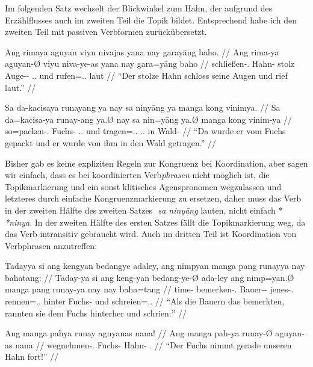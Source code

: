 \documentclass[12pt,paper=a4]{scrartcl}
\newcommand{\PargI}{{\Parg}.{\Inan}}
\newcommand{\TsgM}{{\Tsg}.{\M}}
\newcommand{\TplM}{{\Tpl}.{\M}}
\newcommand{\zwsp}{\mbox{​}} %
\newcommand{\rayr}[2]{\zwsp\smash{{\Tagati #1}} \emph{#2}} %
\begin{document}
Im folgenden Satz wechselt der Blickwinkel zum Hahn, der aufgrund des Erzählflusses auch im zweiten Teil die Topik bildet. Entsprechend habe ich den zweiten Teil mit passiven Verbformen zurückübersetzt. 

\pex %
\a\begingl
	\gla Ang rimaya aguyan viyu nivajas yana nay garayāng baho. //
	\glb Ang rima-ya aguyan-Ø viyu niva-ye-as yana nay gara=yāng baho //
	\glc \AgtT{} schließen-\TsgM{} Hahn-\Top{} stolz Auge-\Pl{}-\Parg{} \TsgM{}.\Gen{} und rufen=\TsgM{}.\Aarg{} laut //
	\glft \enquote{Der stolze Hahn schloss seine Augen und rief laut.} //
\endgl

\a\begingl
	\gla Sa da-kacisaya runayang ya nay sa ninyāng ya manga kong vinimya. //
	\glb Sa da=kacisa-ya runay-ang ya.Ø nay sa nin=yāng ya.Ø manga kong vinim-ya //
	\glc \PatT{} so=packen-\TsgM{} Fuchs-\Aarg{} \TsgM{}.\Top{} und \PatT{} tragen=\TsgM{}.\Aarg{} \TsgM{}.\Top{} \Dyn{} in Wald-\Loc{} //
	\glft \enquote{Da wurde er vom Fuchs gepackt und er wurde von ihm in den Wald getragen.} //
\endgl

\xe

Bisher gab es keine expliziten Regeln zur Kongruenz bei Koordination, aber sagen wir einfach, dass es bei koordinierten Verb\emph{phrasen} nicht möglich ist, die Topikmarkierung und ein sonst klitisches Agenspronomen wegzulassen und letzteres durch einfache Kongruenzmarkierung zu ersetzen, daher muss das Verb in der zweiten Hälfte des zweiten Satzes \rayr{s ninFyaaNF}{sa ninyāng} lauten, nicht einfach *\rayr{ninY}{*ninya}. In der zweiten Hälfte des ersten Satzes fällt die Topikmarkierung weg, da das Verb intransitiv gebraucht wird. Auch im dritten Teil ist Koordination von Verbphrasen anzutreffen:

\pex %
\a\begingl
	\gla Tadayya si ang kengyan bedangye adaley, ang nimpyan manga pang runayya nay bahatang: //
	\glb Taday-ya si ang keng-yan bedang-ye-Ø ada-ley ang nimp=yan.Ø manga pang runay-ya nay nay baha=tang //
	\glc time-\Loc{} \Rel{} \AgtT{} bemerken-\TplM{} Bauer-\Pl{}-\Top{} jenes-\PargI{} \AgtT{} rennen=\TplM{}.\Top{} \Dyn{} hinter Fuchs-\Loc{} und schreien=\TplM{}.\Aarg{} //
	\glft \enquote{Als die Bauern das bemerkten, rannten sie dem Fuchs hinterher und schrien:} //
\endgl

\a\begingl
	\gla Ang manga pahya runay aguyanas nana! //
	\glb Ang manga pah-ya runay-Ø aguyan-as nana //
	\glc \AgtT{} \Prog{} wegnehmen-\TsgM{} Fuchs-\Top{} Hahn-\Parg{} \Fsg{}.\Gen{} //
	\glft \enquote{Der Fuchs nimmt gerade unseren Hahn fort!} //
\endgl
\end{document}
